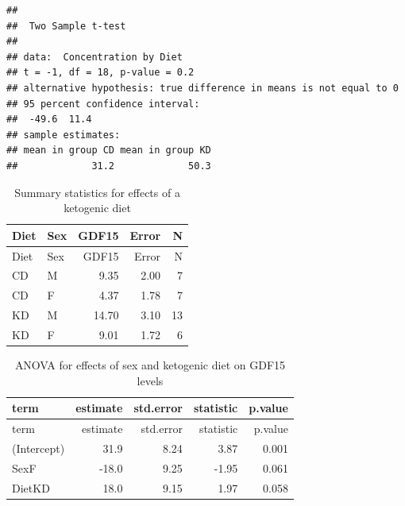 \documentclass[]{article}
\begin{document}
\begin{verbatim}
## 
##  Two Sample t-test
## 
## data:  Concentration by Diet
## t = -1, df = 18, p-value = 0.2
## alternative hypothesis: true difference in means is not equal to 0
## 95 percent confidence interval:
##  -49.6  11.4
## sample estimates:
## mean in group CD mean in group KD 
##             31.2             50.3
\end{verbatim}

\begin{longtable}[]{@{}llrrr@{}}
\caption{Summary statistics for effects of a ketogenic
diet}\tabularnewline
\toprule
Diet & Sex & GDF15 & Error & N\tabularnewline
\midrule
\endfirsthead
\toprule
Diet & Sex & GDF15 & Error & N\tabularnewline
\midrule
\endhead
CD & M & 9.35 & 2.00 & 7\tabularnewline
CD & F & 4.37 & 1.78 & 7\tabularnewline
KD & M & 14.70 & 3.10 & 13\tabularnewline
KD & F & 9.01 & 1.72 & 6\tabularnewline
\bottomrule
\end{longtable}

\begin{longtable}[]{@{}lrrrr@{}}
\caption{ANOVA for effects of sex and ketogenic diet on GDF15
levels}\tabularnewline
\toprule
term & estimate & std.error & statistic & p.value\tabularnewline
\midrule
\endfirsthead
\toprule
term & estimate & std.error & statistic & p.value\tabularnewline
\midrule
\endhead
(Intercept) & 31.9 & 8.24 & 3.87 & 0.001\tabularnewline
SexF & -18.0 & 9.25 & -1.95 & 0.061\tabularnewline
DietKD & 18.0 & 9.15 & 1.97 & 0.058\tabularnewline
\bottomrule
\end{longtable}
\end{document}
